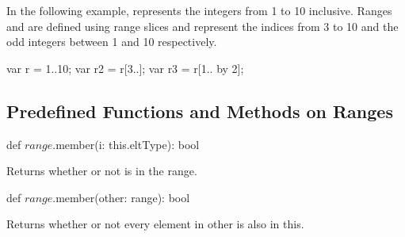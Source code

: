 \begin{example}
In the following example,  represents the integers from 1 to
10 inclusive.  Ranges  and  are defined using range
slices and represent the indices from 3 to 10 and the odd integers
between 1 and 10 respectively.
\begin{chapel}
var r = 1..10;
var r2 = r[3..];
var r3 = r[1.. by 2];
\end{chapel}
\end{example}

\subsection{Predefined Functions and Methods on Ranges}

\begin{protohead}
def $range$.member(i: this.eltType): bool
\end{protohead}
\begin{protobody}
Returns whether or not  is in the range.
\end{protobody}

\begin{protohead}
def $range$.member(other: range): bool
\end{protohead}
\begin{protobody}
Returns whether or not every element in other is also in this.
\end{protobody}
